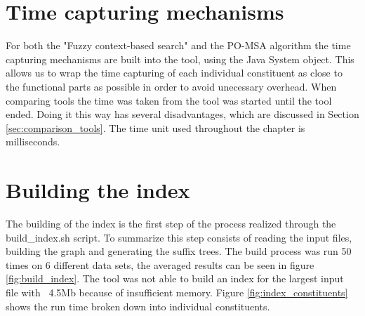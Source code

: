 \documentclass[thesis.tex]{subfiles}
\begin{document}
\section{Time capturing mechanisms}
For both the "Fuzzy context-based search" and the PO-MSA algorithm the time capturing mechanisms are built into the tool, using the Java System object. This allows us to wrap the time capturing of each individual constituent as close to the functional parts as possible in order to avoid unecessary overhead. When comparing tools the time was taken from the tool was started until the tool ended. Doing it this way has several disadvantages, which are discussed in Section \ref{sec:comparison_tools}. The time unit used throughout the chapter is milliseconds.
\section{Building the index}
\label{sec:building_the_index}
The building of the index is the first step of the process realized through the build\_index.sh script. To summarize this step consists of reading the input files, building the graph and generating the suffix trees. The build process was run 50 times on 6 different data sets, the averaged results can be seen in figure \ref{fig:build_index}. The tool was not able to build an index for the largest input file with ~4.5Mb because of insufficient memory. Figure \ref{fig:index_constituents} shows the run time broken down into individual constituents.\\
\end{document}
